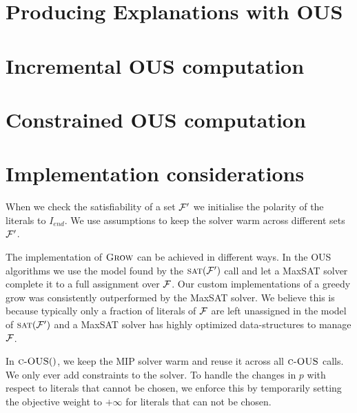 \documentclass[letterpaper]{article} %
\newcommand\m[1]{\ensuremath{\mathcal{#1}}}
\newcommand\comment[1]{\marginpar{\parbox{\marginparwidth-20pt}{\tiny #1}}}
\newcommand{\todo}[1]{{\comment{\color{red}\textsc{TODO:}#1} }}
\newcommand\formula{\ensuremath{\m{F} }\xspace}
\newcommand\mm[1]{\ensuremath{#1}\xspace}
\newcommand\call[1]{\mm{\textsc{#1}}}
\newcommand\sat{\mm{\call{sat}}}
\newcommand\grow{\mm{\call{Grow}}}
\newcommand\comus{\mm{\call{c-OUS}}}
\renewcommand{\todo}[1]{{\comment{\color{red}\textsc{TODO:}#1} }}
\begin{document}
\section{Producing Explanations with OUS}\label{sec:Greedy}\label{sec:explain}



\section{Incremental OUS computation} \label{sec:incremental}


\section{Constrained OUS computation} \label{sec:constrained}


\section{Implementation considerations}\label{sec:impl}
When we check the satisfiability of a set $\F'$ we initialise the polarity of the literals to $I_{end}$. We use assumptions to keep the solver warm across different sets $\F'$.

The implementation of \grow can be achieved in different ways.
In the OUS algorithms we use the model found by the $\sat(\F')$ call and let a MaxSAT solver complete it to a full assignment over $\F$. Our custom implementations of a greedy grow was consistently outperformed by the MaxSAT solver. We believe this is because typically only a fraction of literals of $\F$ are left unassigned in the model of $\sat(\F')$ and a MaxSAT solver has highly optimized data-structures to manage $\F$.  %

In $\comus()$, we keep the MIP solver warm and reuse it across all $\comus$ calls. We only ever add constraints to the solver. To handle the changes in $p$ with respect to literals that cannot be chosen, we enforce this by temporarily setting the objective weight to $+\infty$ for literals that can not be chosen.


% 
\end{document}

